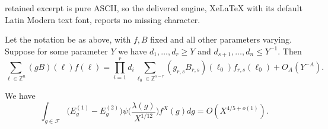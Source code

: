 \documentclass[10pt,a4paper]{amsart}
\def\FF{{\mathcal F}}
\def\Z{{\mathbb Z}}
\begin{document}
retained excerpt is pure ASCII, so the delivered engine, XeLaTeX with its default Latin Modern text font, reports no missing character.
\begin{theorem}\label{thm:projectlargecoords}
    Let the notation be as above, with $f,B$ fixed and all other parameters varying. Suppose for some parameter $Y$ we have $d_1,\dots,d_r\geq Y$ and $d_{s+1},\dots,d_n\leq Y^{-1}$. Then
\begin{equation*}
\sum_{\ell\in \Z^n}(gB)(\ell)f(\ell) = \prod_{i=1}^r d_i  \sum_{\ell_0\in \Z^{s-r}}(g_{r,s}B_{r,s})(\ell_0)f_{r,s}(\ell_0) + O_A(Y^{-A}).
\end{equation*}
\end{theorem}

\begin{lemma}\label{lem:Ab11_to_A_fiber}
We have
\begin{equation*}
\int_{g\in\FF}\bigl(E_g^{(1)}-E_g^{(2)}\bigr)
\psi\Big(\frac{\lambda(g)}{X^{1/12}}\Big)f^X(g)dg
=O(X^{4/5+o(1)}).
\end{equation*}
\end{lemma}
\end{document}
